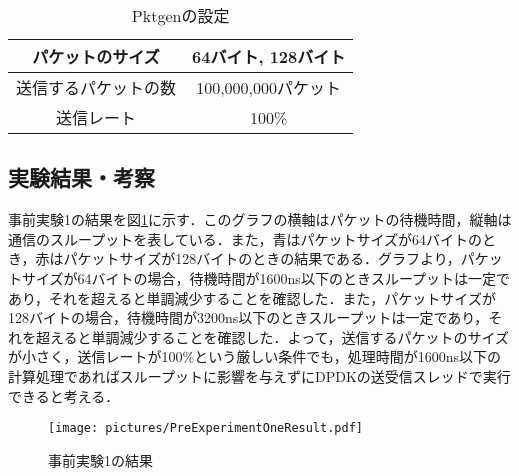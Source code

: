 \begin{table}[htb]
  \centering
  \caption{Pktgenの設定}
  \begin{tabular}{|c|c|} \hline
    パケットのサイズ     & 64バイト, 128バイト \\ \hline
    送信するパケットの数 & 100,000,000パケット \\ \hline
    送信レート           & 100\%               \\ \hline
  \end{tabular}
  \label{tab:PktgenSettings}
\end{table}

\subsection{実験結果・考察}
事前実験1の結果を図\ref{fig:PreExperimentOneResult}に示す．このグラフの横軸はパケットの待機時間，縦軸は通信のスループットを表している．また，青はパケットサイズが64バイトのとき，赤はパケットサイズが128バイトのときの結果である．グラフより，パケットサイズが64バイトの場合，待機時間が1600ns以下のときスループットは一定であり，それを超えると単調減少することを確認した．また，パケットサイズが128バイトの場合，待機時間が3200ns以下のときスループットは一定であり，それを超えると単調減少することを確認した．よって，送信するパケットのサイズが小さく，送信レートが100\%という厳しい条件でも，処理時間が1600ns以下の計算処理であればスループットに影響を与えずにDPDKの送受信スレッドで実行できると考える．

\begin{figure}[htb]
  \centering
  \texttt{[image: pictures/PreExperimentOneResult.pdf]}
  \caption{事前実験1の結果}
  \label{fig:PreExperimentOneResult}
\end{figure}
